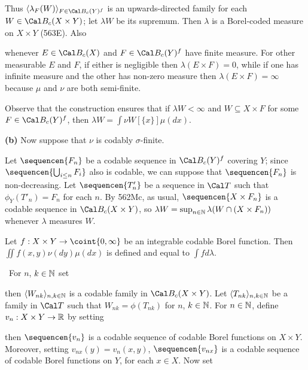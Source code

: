 {\noindent Thus $\langle\lambda_F(W)\rangle_{F\in\Cal B_c(Y)^f}$ is an
upwards-directed family for each $W\in\Cal B_c(X\times Y)$;  let
$\lambda W$ be its supremum.   Then $\lambda$ is a Borel-coded measure on
$X\times Y$ (563E).   Also


\noindent whenever $E\in\Cal B_c(X)$ and $F\in\Cal B_c(Y)^f$
have finite measure.
For other measurable $E$ and $F$, if either is negligible then
$\lambda(E\times F)=0$, while if one has infinite measure and the other has
non-zero measure then $\lambda(E\times F)=\infty$ because $\mu$ and $\nu$
are both semi-finite.

Observe that the construction ensures that if $\lambda W<\infty$ and
$W\subseteq X\times F$ for some $F\in\Cal B_c(Y)^f$, then
$\lambda W=\int\nu W[\{x\}]\mu(dx)$.

\medskip

{\bf (b)} Now suppose that $\nu$ is codably $\sigma$-finite.

\medskip

 Let
$\sequencen{F_n}$ be a codable sequence in $\Cal B_c(Y)^f$ covering $Y$;
since $\sequencen{\bigcup_{i\le n}F_i}$ also is codable, we can suppose
that $\sequencen{F_n}$ is non-decreasing.   Let $\sequencen{T'_n}$ be
a sequence in $\Cal T$ such that $\phi_Y(T'_n)=F_n$ for each $n$.   By
562Mc, as usual, $\sequencen{X\times F_n}$ is a codable sequence in
$\Cal B_c(X\times Y)$, so
$\lambda W=\sup_{n\in\Bbb N}\lambda(W\cap(X\times F_n))$ whenever
$\lambda$ measures $W$.

\medskip

 Let
$f:X\times Y\to\coint{0,\infty}$ be an integrable codable Borel function.
Then $\iint f(x,y)\nu(dy)\mu(dx)$ is defined and equal to
$\int fd\lambda$.

\quad\Prf\grheada\ For $n$, $k\in\Bbb N$ set


\noindent then $\langle W_{nk}\rangle_{n,k\in\Bbb N}$ is a codable family
in $\Cal B_c(X\times Y)$.   Let $\langle T_{nk}\rangle_{n,k\in\Bbb N}$ be a
family in $\Cal T$ such that $W_{nk}=\phi(T_{nk})$ for $n$, $k\in\Bbb N$.
For $n\in\Bbb N$, define $v_n:X\times Y\to\Bbb R$ by setting


\noindent then $\sequencen{v_n}$ is a codable sequence of codable Borel
functions on $X\times Y$.   Moreover, setting $v_{nx}(y)=v_n(x,y)$,
$\sequencen{v_{nx}}$ is a codable sequence of codable Borel functions on
$Y$, for each $x\in X$.   Now set

}
